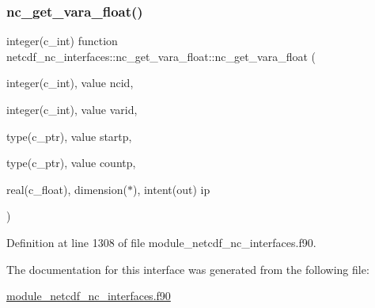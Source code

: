 \subsubsection{\texorpdfstring{nc\+\_\+get\+\_\+vara\+\_\+float()}{nc\_get\_vara\_float()}}
{\footnotesize\ttfamily integer(c\+\_\+int) function netcdf\+\_\+nc\+\_\+interfaces\+::nc\+\_\+get\+\_\+vara\+\_\+float\+::nc\+\_\+get\+\_\+vara\+\_\+float (\begin{DoxyParamCaption}\item[{integer(c\+\_\+int), value}]{ncid,  }\item[{integer(c\+\_\+int), value}]{varid,  }\item[{type(c\+\_\+ptr), value}]{startp,  }\item[{type(c\+\_\+ptr), value}]{countp,  }\item[{real(c\+\_\+float), dimension($\ast$), intent(out)}]{ip }\end{DoxyParamCaption})}



Definition at line 1308 of file module\+\_\+netcdf\+\_\+nc\+\_\+interfaces.\+f90.



The documentation for this interface was generated from the following file\+:\begin{DoxyCompactItemize}
\item 
\hyperlink{module__netcdf__nc__interfaces_8f90}{module\+\_\+netcdf\+\_\+nc\+\_\+interfaces.\+f90}\end{DoxyCompactItemize}
